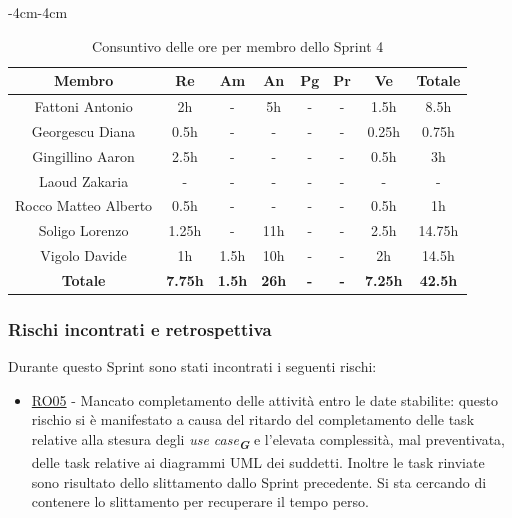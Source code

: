 \documentclass[a4paper,12pt]{article}
\newcommand{\glossario}[1]{\textit{#1}\textsubscript{\textbf{\textit{\textcolor{lightblack}{G}}}}}
\begin{document}
\begin{table}[H]
    \begin{adjustwidth}{-4cm}{-4cm}
    \centering
    \begin{tabular}{|c|c|c|c|c|c|c|c|}
        \hline
        \textbf{Membro} & \textbf{Re} & \textbf{Am}  & \textbf{An} & \textbf{Pg} & \textbf{Pr} & \textbf{Ve} & \textbf{Totale} \\
        \hline
        Fattoni Antonio         & 2h        & -     & 5h    & - & - & 1.5h      & 8.5h \\
        \hline
        Georgescu Diana         & 0.5h      & -     & -     & - & - & 0.25h     & 0.75h \\
        \hline
        Gingillino Aaron        & 2.5h      & -     & -     & - & - & 0.5h      & 3h \\
        \hline
        Laoud Zakaria           & -         & -     & -     & - & - & -         & - \\
        \hline
        Rocco Matteo Alberto    & 0.5h      & -     & -     & - & - & 0.5h      & 1h \\
        \hline
        Soligo Lorenzo          & 1.25h     & -     & 11h   & - & - & 2.5h      & 14.75h \\
        \hline
        Vigolo Davide           & 1h        & 1.5h  & 10h   & - & - & 2h        & 14.5h \\
        \hline
        \textbf{Totale} & \textbf{7.75h} & \textbf{1.5h} & \textbf{26h} & \textbf{-} & \textbf{-} & \textbf{7.25h} & \textbf{42.5h} \\
        \hline
    \end{tabular}
    \caption{Consuntivo delle ore per membro dello Sprint 4}
    \end{adjustwidth}
\end{table}

\subsubsection{Rischi incontrati e retrospettiva}
Durante questo Sprint sono stati incontrati i seguenti rischi:
\begin{itemize}
    \item \hyperref[RO05]{RO05} - Mancato completamento delle attività entro le date stabilite: questo rischio si è manifestato a causa del ritardo del completamento delle task relative alla stesura degli \glossario{use case} e l'elevata complessità, mal preventivata, delle task relative ai diagrammi UML dei suddetti. Inoltre le task rinviate sono risultato dello slittamento dallo Sprint precedente. Si sta cercando di contenere lo slittamento per recuperare il tempo perso.
\end{itemize}
\end{document}
